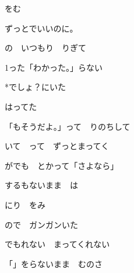 \documentclass[a4paper,tate,twocolumn,12pt]{ltjtarticle}
\begin{document}
\thispagestyle{empty}

\begin{center}
{\LARGE {}をむ}

{\large ずっとでいいのに。}
\end{center}

\vspace{1em}

\begin{flushleft}

\noindent\begin{minipage}{\linewidth}
の　いつもり　りぎて

1った「わかった。」らない

*でしょ？にいた

はってた
\end{minipage}

\vspace{2em}

\noindent\begin{minipage}{\linewidth}

「もそうだよ。」って　りのちして

いて　って　ずっとまってく

がでも　とかって「さよなら」

するもないまま　は
\end{minipage}

\vspace{2em}

\noindent\begin{minipage}{\linewidth}
にり　をみ

ので　ガンガンいた

でもれない　まってくれない

「」をらないまま　むのさ
\end{minipage}

\vspace{2em}


\end{flushleft}
\end{document}

